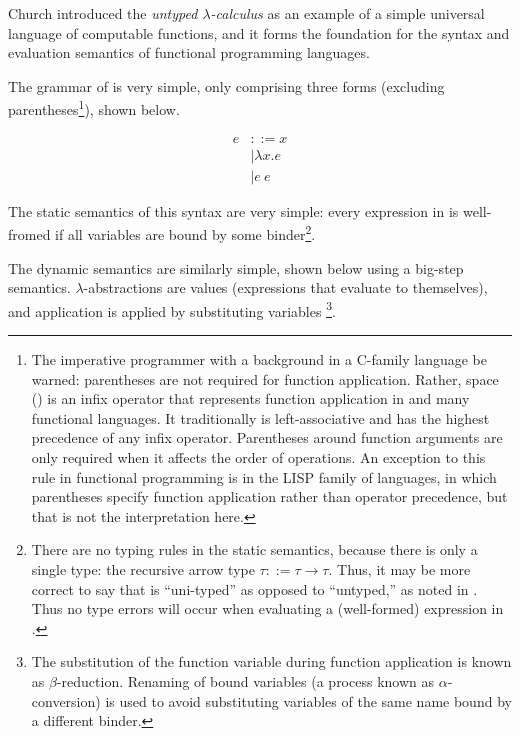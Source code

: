 Church introduced the \textit{untyped $\lambda$-calculus} \ulc{} as an example of a simple universal language of computable functions, and it forms the foundation for the syntax and evaluation semantics of functional programming languages.

The grammar of \ulc{} is very simple, only comprising three forms (excluding parentheses\footnote{The imperative programmer with a background in a C-family language be warned: parentheses are not required for function application. Rather, space (\textvisiblespace) is an infix operator that represents function application in \ulc{} and many functional languages. It traditionally is left-associative and has the highest precedence of any infix operator. Parentheses around function arguments are only required when it affects the order of operations. An exception to this rule in functional programming is in the LISP family of languages, in which parentheses specify function application rather than operator precedence, but that is not the interpretation here.}), shown below.

\begin{singlespace}
  \begin{align*}
    e &::= x\tag{variable}\\
      &\mid \lambda x.e\tag{$\lambda$-abstraction}\\
      &\mid e\ e\tag{function application}
  \end{align*}
\end{singlespace}

The static semantics of this syntax are very simple: every expression in \ulc{} is well-fromed if all variables are bound by some binder\footnote{There are no typing rules in the static semantics, because there is only a single type: the recursive arrow type $\tau::=\tau\to\tau$. Thus, it may be more correct to say that \ulc{} is ``uni-typed'' as opposed to ``untyped,'' as noted in \cite{harper2016practical}. Thus no type errors will occur when evaluating a (well-formed) expression in \ulc{}.}.

The dynamic semantics are similarly simple, shown below using a big-step semantics. $\lambda$-abstractions are values (expressions that evaluate to themselves), and application is applied by substituting variables \footnote{The substitution of the function variable during function application is known as $\beta$-reduction. Renaming of bound variables (a process known as $\alpha$-conversion) is used to avoid substituting variables of the same name bound by a different binder.}.

